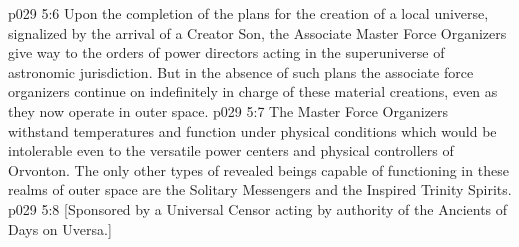 \vs p029 5:6 Upon the completion of the plans for the creation of a local universe, signalized by the arrival of a Creator Son, the Associate Master Force Organizers give way to the orders of power directors acting in the superuniverse of astronomic jurisdiction. But in the absence of such plans the associate force organizers continue on indefinitely in charge of these material creations, even as they now operate in outer space.
\vs p029 5:7 The Master Force Organizers withstand temperatures and function under physical conditions which would be intolerable even to the versatile power centers and physical controllers of Orvonton. The only other types of revealed beings capable of functioning in these realms of outer space are the Solitary Messengers and the Inspired Trinity Spirits.\plusone
\vsetoff
\vs p029 5:8 [Sponsored by a Universal Censor acting by authority of the Ancients of Days on Uversa.]
